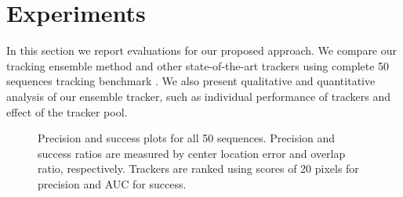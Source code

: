 \chapter{Experiments} %

\label{chapter4} %


In this section we report evaluations for our proposed approach. We compare our
tracking ensemble method and other state-of-the-art trackers using complete
50 sequences tracking benchmark \cite{Wu2013}. We also present qualitative and
quantitative analysis of our ensemble tracker, such as
individual performance of trackers and effect of the tracker pool.

\label{sec:experiments}

\begin{figure}[t]
\centering
{}
\caption{\small  Precision and success plots for all 50 sequences. Precision and success
		ratios are measured by center location error and overlap ratio,
		respectively. Trackers are ranked using scores of 20 pixels for
		precision and AUC for success.}
\label{fig:results}
\end{figure}

